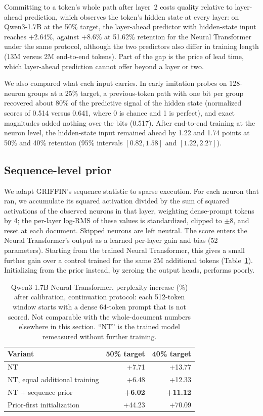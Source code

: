 \documentclass[10pt,twocolumn,letterpaper]{article}
\begin{document}
Committing to a token's whole path after layer~2 costs quality relative to layer-ahead prediction, which observes the token's hidden state at every layer: on Qwen3-1.7B at the 50\% target, the layer-ahead predictor with hidden-state input reaches +2.64\%, against +8.6\% at 51.62\% retention for the Neural Transformer under the same protocol, although the two predictors also differ in training length (13M versus 2M end-to-end tokens). Part of the gap is the price of lead time, which layer-ahead prediction cannot offer beyond a layer or two.

We also compared what each input carries. In early imitation probes on 128-neuron groups at a 25\% target, a previous-token path with one bit per group recovered about 80\% of the predictive signal of the hidden state (normalized scores of 0.514 versus 0.641, where 0 is chance and 1 is perfect), and exact magnitudes added nothing over the bits (0.517). After end-to-end training at the neuron level, the hidden-state input remained ahead by 1.22 and 1.74 points at 50\% and 40\% retention (95\% intervals $[0.82, 1.58]$ and $[1.22, 2.27]$).

\subsection{Sequence-level prior}
\label{sec:prior}

We adapt GRIFFIN's sequence statistic to sparse execution. For each neuron that ran, we accumulate its squared activation divided by the sum of squared activations of the observed neurons in that layer, weighting dense-prompt tokens by 4; the per-layer log-RMS of these values is standardized, clipped to $\pm 8$, and reset at each document. Skipped neurons are left neutral. The score enters the Neural Transformer's output as a learned per-layer gain and bias (52 parameters). Starting from the trained Neural Transformer, this gives a small further gain over a control trained for the same 2M additional tokens (Table~\ref{tab:prior}). Initializing from the prior instead, by zeroing the output heads, performs poorly.

\begin{table}[t]
\centering
\caption{Qwen3-1.7B Neural Transformer, perplexity increase (\%) after calibration, continuation protocol: each 512-token window starts with a dense 64-token prompt that is not scored. Not comparable with the whole-document numbers elsewhere in this section. ``NT'' is the trained model remeasured without further training.}
\label{tab:prior}
\small
\begin{tabular}{@{}lrr@{}}
\toprule
Variant & 50\% target & 40\% target \\
\midrule
NT & +7.71 & +13.77 \\
NT, equal additional training & +6.48 & +12.33 \\
NT + sequence prior & \textbf{+6.02} & \textbf{+11.12} \\
Prior-first initialization & +44.23 & +70.09 \\
\bottomrule
\end{tabular}
\end{table}
\end{document}
